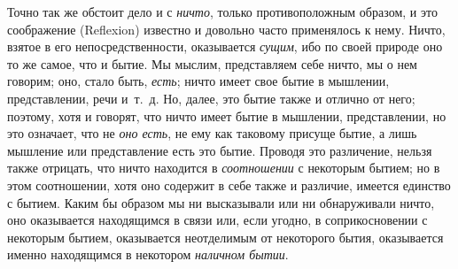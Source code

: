 Точно так же обстоит дело и с {\em ничто}, только
противоположным образом, и это соображение (Reflexion) известно и довольно
часто применялось к нему. Ничто, взятое в его непосредственности,
оказывается {\em сущим}, ибо по своей природе оно то же
самое, что и бытие. Мы мыслим, представляем себе ничто, мы о нем говорим;
оно, стало быть, {\em есть}; ничто имеет свое бытие в
мышлении, представлении, речи и~т.~д. Но, далее, это бытие также и отлично
от него; поэтому, хотя и говорят, что ничто имеет бытие в мышлении,
представлении, но это означает, что не {\em оно есть},
не ему как таковому присуще бытие, а лишь мышление или представление есть
это бытие. Проводя это различение, нельзя также отрицать, что ничто
находится в {\em соотношении} с некоторым бытием; но в
этом соотношении, хотя оно содержит в себе также и различие, имеется
единство с бытием. Каким бы образом мы ни высказывали или ни обнаруживали
ничто, оно оказывается находящимся в связи или, если угодно, в
соприкосновении с некоторым бытием, оказывается неотделимым от некоторого
бытия, оказывается именно находящимся в некотором
{\em наличном бытии}.

